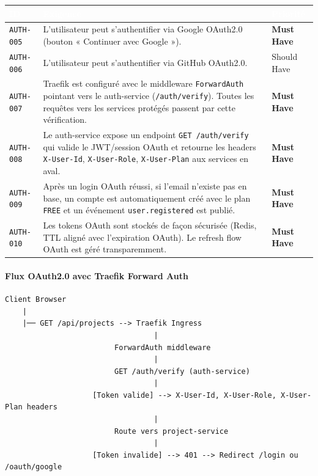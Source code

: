 \documentclass[12pt,a4paper]{article}
\newcommand{\req}[1]{\texttt{\textcolor{daedalusblue}{#1}}}
\newcommand{\musthave}{\cellcolor{musthave}\textbf{Must Have}}
\newcommand{\shouldhave}{\cellcolor{shouldhave}Should Have}
\begin{document}
\begin{tabularx}{\textwidth}{|l|X|l|}
\hline
\rowcolor{tablehead}\textcolor{white}{\textbf{ID}} & \textcolor{white}{\textbf{Exigence}} & \textcolor{white}{\textbf{Priorité}} \\
\hline
\req{AUTH-005} & L'utilisateur peut s'authentifier via Google OAuth2.0 (bouton « Continuer avec Google »). & \musthave \\
\hline
\req{AUTH-006} & L'utilisateur peut s'authentifier via GitHub OAuth2.0. & \shouldhave \\
\hline
\req{AUTH-007} & Traefik est configuré avec le middleware \texttt{ForwardAuth} pointant vers le auth-service (\texttt{/auth/verify}). Toutes les requêtes vers les services protégés passent par cette vérification. & \musthave \\
\hline
\req{AUTH-008} & Le auth-service expose un endpoint \texttt{GET /auth/verify} qui valide le JWT/session OAuth et retourne les headers \texttt{X-User-Id}, \texttt{X-User-Role}, \texttt{X-User-Plan} aux services en aval. & \musthave \\
\hline
\req{AUTH-009} & Après un login OAuth réussi, si l'email n'existe pas en base, un compte est automatiquement créé avec le plan \texttt{FREE} et un événement \texttt{user.registered} est publié. & \musthave \\
\hline
\req{AUTH-010} & Les tokens OAuth sont stockés de façon sécurisée (Redis, TTL aligné avec l'expiration OAuth). Le refresh flow OAuth est géré transparemment. & \musthave \\
\hline
\end{tabularx}

\paragraph{Flux OAuth2.0 avec Traefik Forward Auth}

\begin{lstlisting}[language={}]
Client Browser
    |
    |── GET /api/projects --> Traefik Ingress
                                  |
                         ForwardAuth middleware
                                  |
                         GET /auth/verify (auth-service)
                                  |
                    [Token valide] --> X-User-Id, X-User-Role, X-User-Plan headers
                                  |
                         Route vers project-service
                                  |
                    [Token invalide] --> 401 --> Redirect /login ou /oauth/google
\end{lstlisting}
\end{document}
